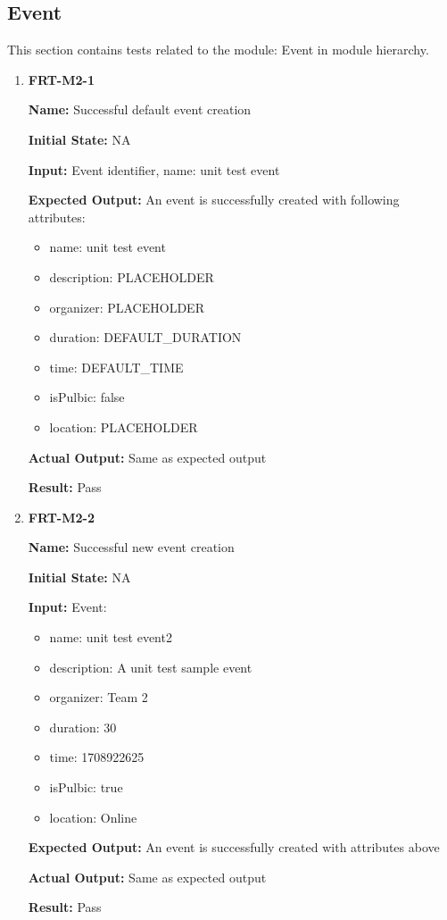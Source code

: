 \documentclass[12pt, titlepage]{article}
\begin{document}
\subsection{Event}
This section contains tests related to the module: Event in module hierarchy.
\begin{enumerate}
\item \textbf{FRT-M2-1}

\textbf{Name:} Successful default event creation

\textbf{Initial State:} NA

\textbf{Input:} Event identifier, name: unit test event

\textbf{Expected Output:} An event is successfully created with following attributes:
\begin{itemize}
\item name: unit test event
\item description: PLACEHOLDER
\item organizer: PLACEHOLDER
\item duration: DEFAULT\_DURATION
\item time: DEFAULT\_TIME
\item isPulbic: false
\item location: PLACEHOLDER
\end{itemize}

\textbf{Actual Output:} Same as expected output

\textbf{Result:} Pass

\item \textbf{FRT-M2-2}

\textbf{Name:} Successful new event creation

\textbf{Initial State:} NA

\textbf{Input:} Event:
\begin{itemize}
\item name: unit test event2
\item description: A unit test sample event
\item organizer: Team 2
\item duration: 30
\item time: 1708922625
\item isPulbic: true
\item location: Online
\end{itemize}
					
\textbf{Expected Output:} An event is successfully created with attributes above

\textbf{Actual Output:} Same as expected output

\textbf{Result:} Pass
\end{enumerate}
\end{document}
